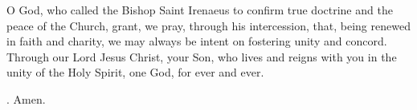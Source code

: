 \lettrine[lines=3]{O}{} God, who called the Bishop Saint Irenaeus
to confirm true doctrine and the peace of the Church,
grant, we pray, through his intercession,
that, being renewed in faith and charity,
we may always be intent on fostering unity and concord.
Through our Lord Jesus Christ, your Son,
who lives and reigns with you in the unity of the Holy Spirit,
one God, for ever and ever. \par \Rbar. Amen.
